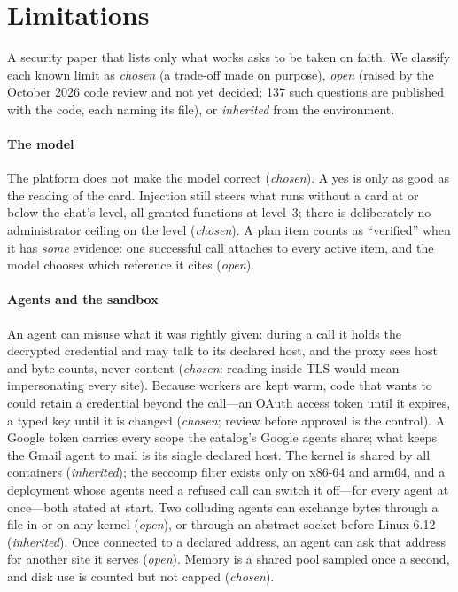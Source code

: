 \section{Limitations}
\label{sec:limitations}

A security paper that lists only what works asks to be taken on faith.
We classify each known limit as \emph{chosen} (a trade-off made on
purpose), \emph{open} (raised by the October 2026 code review and not
yet decided; 137 such questions are published with the code, each
naming its file), or \emph{inherited} from the environment.

\paragraph{The model}
The platform does not make the model correct (\emph{chosen}). A yes is
only as good as the reading of the card. Injection still steers what
runs without a card at or below the chat's level, all granted functions
at level~3; there is deliberately no administrator ceiling on the level
(\emph{chosen}). A plan item counts as ``verified'' when it has
\emph{some} evidence: one successful call attaches to every active
item, and the model chooses which reference it cites (\emph{open}).

\paragraph{Agents and the sandbox}
An agent can misuse what it was rightly given: during a call it holds
the decrypted credential and may talk to its declared host, and the
proxy sees host and byte counts, never content (\emph{chosen}: reading
inside TLS would mean impersonating every site). Because workers are
kept warm, code that wants to could retain a credential beyond the
call---an OAuth access token until it expires, a typed key until it is
changed (\emph{chosen}; review before approval is the control). A
Google token carries every scope the catalog's Google agents share;
what keeps the Gmail agent to mail is its single declared host. The
kernel is shared by all containers (\emph{inherited}); the seccomp
filter exists only on x86-64 and arm64, and a deployment whose agents
need a refused call can switch it off---for every agent at once---both
stated at start. Two colluding
agents can exchange bytes through a file in  or
 on any kernel (\emph{open}), or through an abstract
socket before Linux 6.12 (\emph{inherited}). Once connected to a
declared address, an agent can ask that address for another site it
serves (\emph{open}). Memory is a shared pool sampled once a second, and
disk use is counted but not capped (\emph{chosen}).


